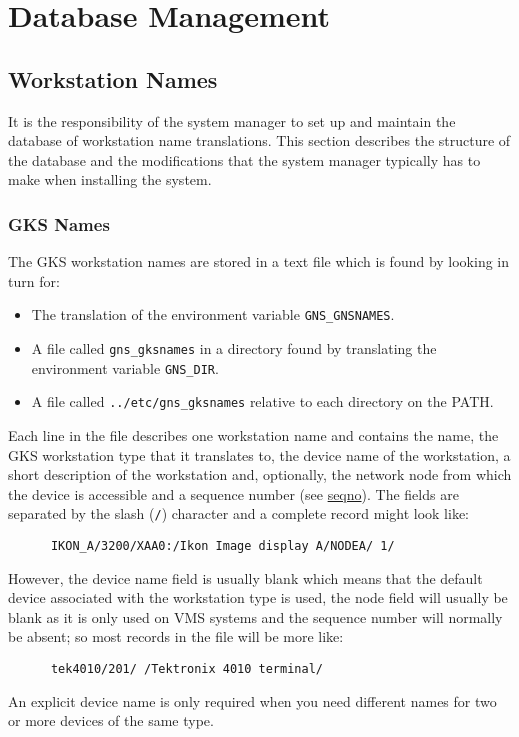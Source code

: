 \section{Database Management}\label{dm}
\subsection{Workstation Names}\label{dwn}

It is the responsibility of the system manager to set up and maintain the
database of workstation name translations.
This section describes the structure of the database and the modifications
that the system manager typically has to make when installing the system.

\subsubsection{GKS Names}\label{GKS-names}

The GKS workstation names are stored in a text file which is found by looking
in turn for:
\begin{itemize}
\item The translation of the environment variable {\tt GNS\_GNSNAMES}.
\item A file called {\tt gns\_gksnames} in a directory found by 
translating the environment variable {\tt GNS\_DIR}.
\item A file called {\tt ../etc/gns\_gksnames} relative to each directory
on the PATH.
\end{itemize}
Each line in the file describes one workstation name
and contains the name, the GKS workstation type that it translates to, the
device name of the workstation, a short description of the workstation and,
optionally, the network node from which the device is accessible and a
sequence number (see \hyperref{this section}{section~}{}{seqno}). The
fields are separated by the slash ({\tt/}) character and a complete record
might look like:
\begin{verbatim}
      IKON_A/3200/XAA0:/Ikon Image display A/NODEA/ 1/
\end{verbatim}
However, the device name field is usually blank which means that the
default device associated with the workstation type is used, the node field
will usually be blank as it is only used on VMS systems 
and the sequence number will normally be absent;
so most records in the file will be more like:
\begin{verbatim}
      tek4010/201/ /Tektronix 4010 terminal/
\end{verbatim}
An explicit device name is only required when you need different names for two
or more devices of the same type. 

